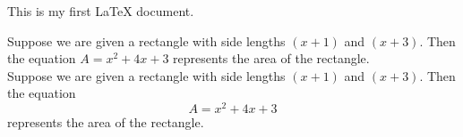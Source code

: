 \documentclass[12pt]{article}
\begin{document}
This is my first LaTeX document.

Suppose we are given a rectangle with side lengths $(x+1)$ and $(x+3)$. Then the equation $A = x^2 + 4x + 3$ represents the area of the rectangle.\\

Suppose we are given a rectangle with side lengths $(x+1)$ and $(x+3)$. Then the equation $$A = x^2 + 4x + 3$$ represents the area of the rectangle.

\end{document}
